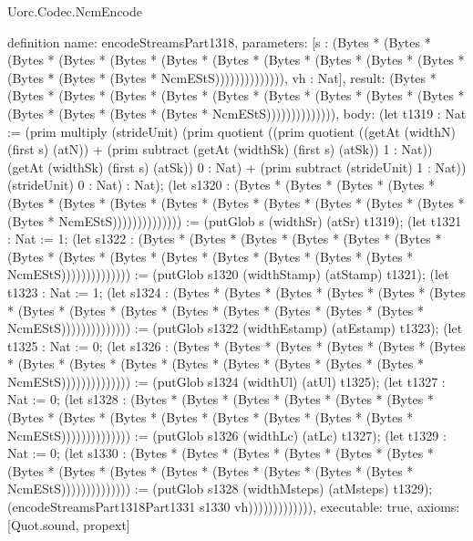 \begin{lexlean}{Uorc.Codec.NcmEncode}
\begin{semanticmodule}
definition{
  name: encodeStreamsPart1318,
  parameters: [s : (Bytes * (Bytes * (Bytes * (Bytes * (Bytes * (Bytes * (Bytes * (Bytes * (Bytes * (Bytes * (Bytes * (Bytes * (Bytes * (Bytes * NcmEStS)))))))))))))), vh : Nat],
  result: (Bytes * (Bytes * (Bytes * (Bytes * (Bytes * (Bytes * (Bytes * (Bytes * (Bytes * (Bytes * (Bytes * (Bytes * (Bytes * (Bytes * NcmEStS)))))))))))))),
  body: (let t1319 : Nat := (prim multiply (strideUnit) (prim quotient ((prim quotient ((getAt (widthN) (first s) (atN)) + (prim subtract (getAt (widthSk) (first s) (atSk)) 1 : Nat)) (getAt (widthSk) (first s) (atSk)) 0 : Nat) + (prim subtract (strideUnit) 1 : Nat)) (strideUnit) 0 : Nat) : Nat); (let s1320 : (Bytes * (Bytes * (Bytes * (Bytes * (Bytes * (Bytes * (Bytes * (Bytes * (Bytes * (Bytes * (Bytes * (Bytes * (Bytes * (Bytes * NcmEStS)))))))))))))) := (putGlob s (widthSr) (atSr) t1319); (let t1321 : Nat := 1; (let s1322 : (Bytes * (Bytes * (Bytes * (Bytes * (Bytes * (Bytes * (Bytes * (Bytes * (Bytes * (Bytes * (Bytes * (Bytes * (Bytes * (Bytes * NcmEStS)))))))))))))) := (putGlob s1320 (widthStamp) (atStamp) t1321); (let t1323 : Nat := 1; (let s1324 : (Bytes * (Bytes * (Bytes * (Bytes * (Bytes * (Bytes * (Bytes * (Bytes * (Bytes * (Bytes * (Bytes * (Bytes * (Bytes * (Bytes * NcmEStS)))))))))))))) := (putGlob s1322 (widthEstamp) (atEstamp) t1323); (let t1325 : Nat := 0; (let s1326 : (Bytes * (Bytes * (Bytes * (Bytes * (Bytes * (Bytes * (Bytes * (Bytes * (Bytes * (Bytes * (Bytes * (Bytes * (Bytes * (Bytes * NcmEStS)))))))))))))) := (putGlob s1324 (widthUl) (atUl) t1325); (let t1327 : Nat := 0; (let s1328 : (Bytes * (Bytes * (Bytes * (Bytes * (Bytes * (Bytes * (Bytes * (Bytes * (Bytes * (Bytes * (Bytes * (Bytes * (Bytes * (Bytes * NcmEStS)))))))))))))) := (putGlob s1326 (widthLc) (atLc) t1327); (let t1329 : Nat := 0; (let s1330 : (Bytes * (Bytes * (Bytes * (Bytes * (Bytes * (Bytes * (Bytes * (Bytes * (Bytes * (Bytes * (Bytes * (Bytes * (Bytes * (Bytes * NcmEStS)))))))))))))) := (putGlob s1328 (widthMsteps) (atMsteps) t1329); (encodeStreamsPart1318Part1331 s1330 vh))))))))))))),
  executable: true,
  axioms: [Quot.sound, propext]
}


\end{semanticmodule}
\end{lexlean}
